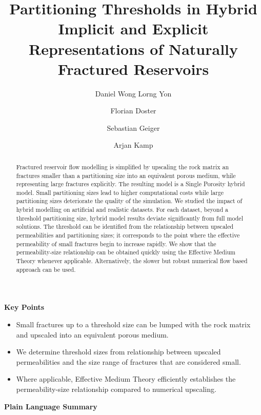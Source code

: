 \documentclass[a4paper]{article}
\title{Partitioning Thresholds in Hybrid Implicit and Explicit Representations of Naturally Fractured Reservoirs}
\author{Daniel Wong Lorng Yon \and Florian Doster \and Sebastian Geiger \and Arjan Kamp}
\begin{document}
\maketitle

\textbf{Key Points}
\begin{itemize}
	\item Small fractures up to a threshold size can be lumped with the rock matrix and upscaled into an equivalent porous medium.
	\item We determine threshold sizes from relationship between upscaled permeabilities and the size range of fractures that are considered small.
	\item Where applicable, Effective Medium Theory efficiently establishes the permeability-size relationship compared to numerical upscaling.
\end{itemize}

\begin{abstract}
Fractured reservoir flow modelling is simplified by upscaling the rock matrix an fractures smaller than a partitioning size into an equivalent porous medium, while representing large fractures explicitly. The resulting model is a Single Porosity hybrid model. Small partitioning sizes lead to higher computational costs while large partitioning sizes deteriorate the quality of the simulation. We studied the impact of hybrid modelling on artificial and realistic datasets. For each dataset, beyond a threshold partitioning size, hybrid model results deviate significantly from full model solutions. The threshold can be identified from the relationship between upscaled permeabilities and partitioning sizes; it corresponds to the point where the effective permeability of small fractures begin to increase rapidly. We show that the permeability-size relationship can be obtained quickly using the Effective Medium Theory whenever applicable. Alternatively, the slower but robust numerical flow based approach can be used.
\end{abstract}

\textbf{Plain Language Summary}
\end{document}
